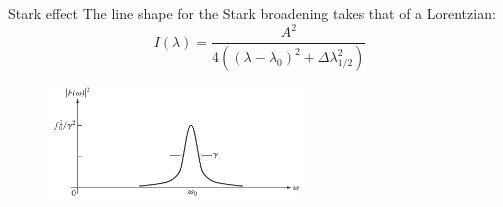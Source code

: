 \documentclass[final]{beamer}
\begin{document}
  \begin{frame}{Stark effect}
    The line shape for the Stark broadening takes that of a Lorentzian:
    \begin{equation*}
      I\left( \lambda \right)=\frac{A^2}{4\left( \left(\lambda-\lambda_0\right)^2+\Delta \lambda_{1/2}^2\right)}
    \end{equation*}
    \begin{figure}
      \includegraphics[width=0.6\textwidth]{figures/lorentzian_lineshape.png}
    \end{figure}
  \end{frame}
\end{document}
